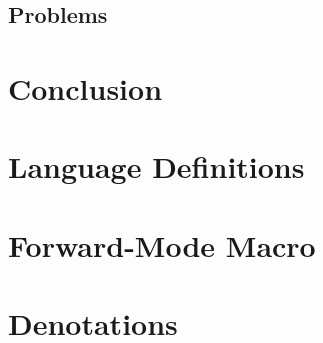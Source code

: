 \documentclass[11pt, final]{article}
\begin{document}
  \subsection{Problems}
  
\section{Conclusion}

\appendix
\section{Language Definitions}
\section{Forward-Mode Macro}
\section{Denotations}
\printbibliography
\makeatother
\end{document}
